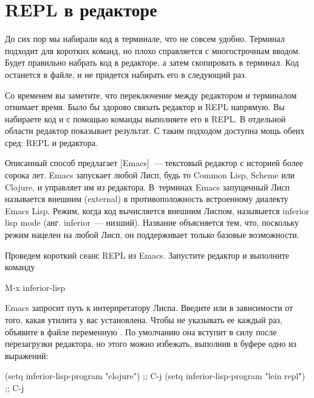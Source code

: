 \section{REPL в редакторе}

До сих пор мы набирали код в терминале, что не совсем удобно. Терминал подходит для коротких команд, но плохо справляется с многострочным вводом. Будет правильно набрать код в редакторе, а затем скопировать в терминал. Код останется в файле, и не придется набирать его в следующий раз.

Со временем вы заметите, что переключение между редактором и терминалом отнимает время. Было бы здорово связать редактор и REPL напрямую. Вы набираете код и с помощью команды выполняете его в REPL. В отдельной области редактор показывает результат. С таким подходом доступна мощь обеих сред: REPL и редактора.

\def\urlemacs{https://www.gnu.org/software/emacs/}

Описанный способ предлагает \footurl{Emacs}{\urlemacs}[Emacs]~--- текстовый редактор с историей более сорока лет. Emacs запускает любой Лисп, будь то Common Lisp, Scheme или Clojure, и управляет им из редактора. В~терминах Emacs запущенный Лисп называется внешним (external) в противоположность встроенному диалекту Emacs Lisp. Режим, когда код вычисляется внешним Лиспом, назывыется inferior lisp mode (анг. inferior~--- низший). Название объясняется тем, что, поскольку режим нацелен на любой Лисп, он поддерживает только базовые возможности.

Проведем короткий сеанс REPL из Emacs. Запустите редактор и выполните команду

\begin{english}
  \begin{text}
M-x inferior-lisp
  \end{text}
\end{english}

Emacs запросит путь к интерпретатору Лиспа. Введите  или  в зависимости от того, какая утилита у вас установлена. Чтобы не указывать ее каждый раз, объявите в файле  переменную . По умолчанию она вступит в силу после перезагрузки редактора, но этого можно избежать, выполнив в буфере  одно из выражений:

\begin{english}
  \begin{lisp}
(setq inferior-lisp-program "clojure") ;; C-j
(setq inferior-lisp-program "lein repl") ;; C-j
  \end{lisp}
\end{english}

